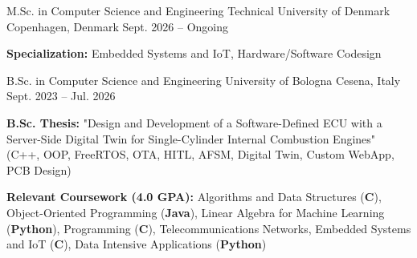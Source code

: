 

\begin{cventries}

\cventry
    {M.Sc. in Computer Science and Engineering} %
    {Technical University of Denmark} %
    {Copenhagen, Denmark} %
    {Sept. 2026 -- Ongoing} %
    {
    \begin{cvitems} %
        \item {\textbf{Specialization:} Embedded Systems and IoT, Hardware/Software Codesign}
    \end{cvitems}
    }

\cventry
    {B.Sc. in Computer Science and Engineering} %
    {University of Bologna} %
    {Cesena, Italy} %
    {Sept. 2023 -- Jul. 2026} %
    {
    \begin{cvitems} %
        \item {\textbf{B.Sc. Thesis:} "Design and Development of a Software-Defined ECU with a Server-Side Digital Twin for Single-Cylinder Internal Combustion Engines" (C++, OOP, FreeRTOS, OTA, HITL, AFSM, Digital Twin, Custom WebApp, PCB Design)}
        \item {\textbf{Relevant Coursework (4.0 GPA):} Algorithms and Data Structures (\textbf{C}), Object-Oriented Programming (\textbf{Java}), Linear Algebra for Machine Learning (\textbf{Python}), Programming (\textbf{C}), Telecommunications Networks, Embedded Systems and IoT (\textbf{C}), Data Intensive Applications (\textbf{Python})}
    \end{cvitems}
    }


\end{cventries}
